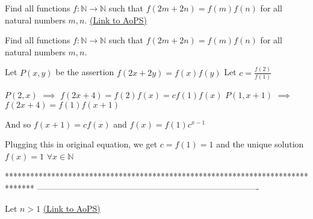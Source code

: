 \begin{problem}
	Find all functions $f : \mathbb{N} \rightarrow \mathbb{N}$ such that $f(2m+2n)=f(m)f(n)$ for all natural numbers $m,n$.
	\flushright \href{https://artofproblemsolving.com/community/c6h474101}{(Link to AoPS)}
\end{problem}



\begin{solution}
	\begin{tcolorbox}Find all functions $f : \mathbb{N} \rightarrow \mathbb{N}$ such that $f(2m+2n)=f(m)f(n)$ for all natural numbers $m,n$.\end{tcolorbox}
Let $P(x,y)$ be the assertion $f(2x+2y)=f(x)f(y)$
Let $c=\frac{f(2)}{f(1)}$

$P(2,x)$ $\implies$ $f(2x+4)=f(2)f(x)=cf(1)f(x)$
$P(1,x+1)$ $\implies$ $f(2x+4)=f(1)f(x+1)$

And so $f(x+1)=cf(x)$ and $f(x)=f(1)c^{x-1}$

Plugging this in original equation, we get $c=f(1)=1$ and the unique solution $\boxed{f(x)=1}$ $\forall x\in\mathbb N$
\end{solution}
*******************************************************************************
-------------------------------------------------------------------------------

\begin{problem}
	Let $n>1$
	\flushright \href{https://artofproblemsolving.com/community/c6h474133}{(Link to AoPS)}
\end{problem}




